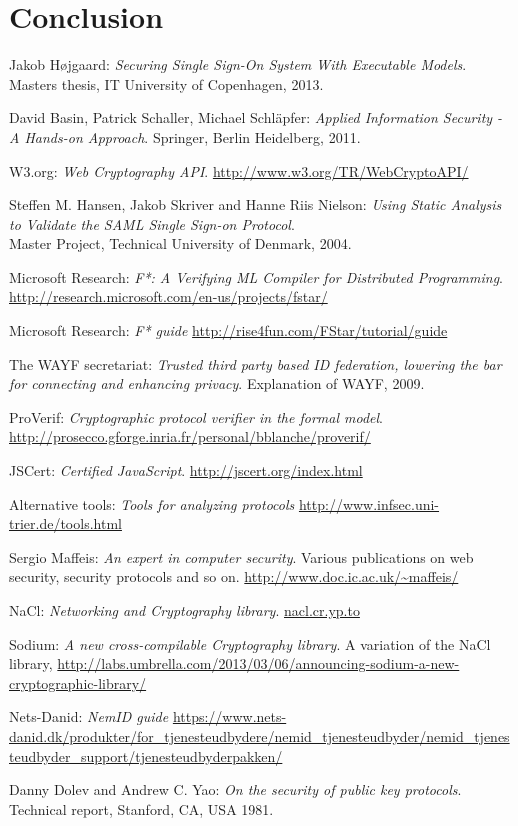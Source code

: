 \documentclass[twosided]{report}
\begin{document}
\section{Conclusion}

\begin{thebibliography}{9}

  Jakob H{\o}jgaard:
  \emph{Securing Single Sign-On System With Executable Models}.
  Masters thesis, IT University of Copenhagen,
  2013.

  David Basin, Patrick Schaller, Michael Schl{\"a}pfer:
  \emph{Applied Information Security - A Hands-on Approach}.
  Springer, Berlin Heidelberg,
  2011.

	W3.org: \emph{Web Cryptography API}. \url{http://www.w3.org/TR/WebCryptoAPI/}

  Steffen M. Hansen, Jakob Skriver and Hanne Riis Nielson:
  \emph{Using Static Analysis to Validate the SAML Single Sign-on Protocol}.
  \\Master Project, Technical University of Denmark,
  2004.

 Microsoft Research:
 \emph{F*: A Verifying ML Compiler for Distributed Programming}.
 \url{http://research.microsoft.com/en-us/projects/fstar/}

 Microsoft Research:
 \emph{F* guide}
 \url{http://rise4fun.com/FStar/tutorial/guide}

 The WAYF secretariat:
 \emph{Trusted third party based ID federation, lowering the bar for
 connecting and enhancing privacy}.
 Explanation of WAYF,
 2009.

 ProVerif:
 \emph{Cryptographic protocol verifier in the formal model}.
 \url{http://prosecco.gforge.inria.fr/personal/bblanche/proverif/}
 
 JSCert:
 \emph{Certified JavaScript}.
 \url{http://jscert.org/index.html}

 Alternative tools:
 \emph{Tools for analyzing protocols}
 \url{http://www.infsec.uni-trier.de/tools.html}

 Sergio Maffeis:
 \emph{An expert in computer security}.
 Various publications on web security, security protocols and so on.
 \url{http://www.doc.ic.ac.uk/~maffeis/}

 NaCl:
 \emph{Networking and Cryptography library}.
 \url{nacl.cr.yp.to}

 Sodium:
 \emph{A new cross-compilable Cryptography library}.
 A variation of the NaCl library,
 \url{http://labs.umbrella.com/2013/03/06/announcing-sodium-a-new-cryptographic-library/}

 Nets-Danid:
 \emph{NemID guide}
 \url{https://www.nets-danid.dk/produkter/for_tjenesteudbydere/nemid_tjenesteudbyder/nemid_tjenesteudbyder_support/tjenesteudbyderpakken/}

 Danny Dolev and Andrew C. Yao:
 \emph{On the security of public key protocols}.
 Technical report, Stanford, CA, USA
 1981.

\end{thebibliography}
\end{document}
